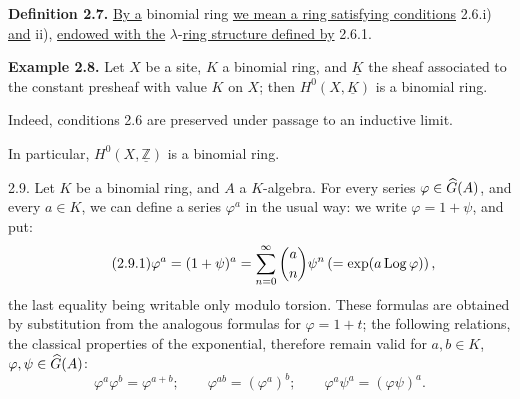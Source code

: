 \textbf{Definition 2.7.} \uline{By a} binomial ring \uline{we mean a ring satisfying conditions} 2.6.i) \uline{and} ii), \uline{endowed with the} \(\lambda\)-\uline{ring structure defined by} 2.6.1.

\textbf{Example 2.8.} Let \(X\) be a site, \(K\) a binomial ring, and \(\underline{K}\) the sheaf associated to the constant presheaf with value \(K\) on \(X\); then \(H^0(X,\underline{K})\) is a binomial ring.

Indeed, conditions 2.6 are preserved under passage to an inductive limit.

In particular, \(H^0(X,\underline{\mathbb Z})\) is a binomial ring.

2.9. Let \(K\) be a binomial ring, and \(A\) a \(K\)-algebra. For every series \(\varphi\in\Ghat(A)\), and every \(a\in K\), we can define a series \(\varphi^a\) in the usual way: we write \(\varphi=1+\psi\), and put:
\begin{equation}\tag{2.9.1}
  \varphi^a=(1+\psi)^a
  =
  \sum_{n=0}^{\infty}\binom{a}{n}\psi^n
  \left(=\exp(a\Log\varphi)\right),
\end{equation}
the last equality being writable only modulo torsion. These formulas are obtained by substitution from the analogous formulas for \(\varphi=1+t\); the following relations, the classical properties of the exponential, therefore remain valid for \(a,b\in K\), \(\varphi,\psi\in\Ghat(A)\):
\begin{equation}\tag{2.9.2}
  \varphi^a\varphi^b=\varphi^{a+b};\qquad
  \varphi^{ab}=(\varphi^a)^b;\qquad
  \varphi^a\psi^a=(\varphi\psi)^a .
\end{equation}

\providecommand{\Ghat}{\widehat G}
\providecommand{\Gg}{\widehat G_g}
\providecommand{\Gcirc}{\widehat G_{\circ}}
\providecommand{\Gnabla}{\widehat G_{\nabla}}
\providecommand{\Grhat}{\widehat{\operatorname{Gr}}}
\providecommand{\Log}{\operatorname{Log}}
\providecommand{\Fil}{\operatorname{Fil}}
\providecommand{\eps}{\varepsilon}
\providecommand{\id}{\operatorname{id}}
\providecommand{\Sym}{\operatorname{Sym}}
\providecommand{\Mon}{\operatorname{Mon}}

\providecommand{\Ghat}{\widehat G}
\providecommand{\Gg}{\widehat G_g}
\providecommand{\Gcirc}{\widehat G_{\circ}}
\providecommand{\Gnabla}{\widehat G_{\nabla}}
\providecommand{\Grhat}{\widehat{\operatorname{Gr}}}
\providecommand{\Log}{\operatorname{Log}}
\providecommand{\Fil}{\operatorname{Fil}}
\providecommand{\eps}{\varepsilon}
\renewcommand{\id}{\operatorname{id}}
\providecommand{\Sym}{\operatorname{Sym}}
\providecommand{\Mon}{\operatorname{Mon}}

